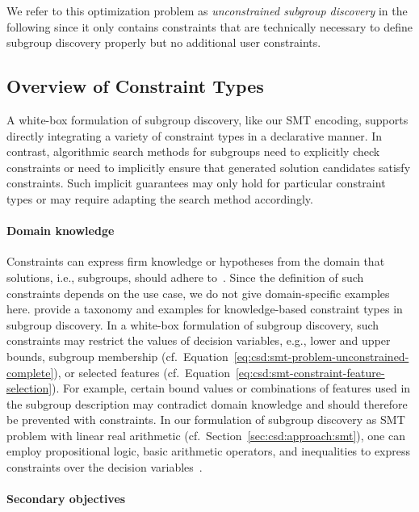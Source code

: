 \documentclass{article}
\theoremstyle{definition}
\begin{document}
We refer to this optimization problem as \emph{unconstrained subgroup discovery} in the following since it only contains constraints that are technically necessary to define subgroup discovery properly but no additional user constraints.

\subsection{Overview of Constraint Types}
\label{sec:csd:approach:constraint-types}

A white-box formulation of subgroup discovery, like our SMT encoding, supports directly integrating a variety of constraint types in a declarative manner.
In contrast, algorithmic search methods for subgroups need to explicitly check constraints or need to implicitly ensure that generated solution candidates satisfy constraints.
Such implicit guarantees may only hold for particular constraint types or may require adapting the search method accordingly.

\paragraph{Domain knowledge}

Constraints can express firm knowledge or hypotheses from the domain that solutions, i.e., subgroups, should adhere to~\cite{bach2022empirical}.
Since the definition of such constraints depends on the use case, we do not give domain-specific examples here.
\cite{atzmueller2006methodological, atzmueller2005exploiting, atzmueller2007using} provide a taxonomy and examples for knowledge-based constraint types in subgroup discovery.
In a white-box formulation of subgroup discovery, such constraints may restrict the values of decision variables, e.g., lower and upper bounds, subgroup membership (cf.~Equation~\ref{eq:csd:smt-problem-unconstrained-complete}), or selected features (cf.~Equation~\ref{eq:csd:smt-constraint-feature-selection}).
For example, certain bound values or combinations of features used in the subgroup description may contradict domain knowledge and should therefore be prevented with constraints.
In our formulation of subgroup discovery as SMT problem with linear real arithmetic (cf.~Section~\ref{sec:csd:approach:smt}), one can employ propositional logic, basic arithmetic operators, and inequalities to express constraints over the decision variables~\cite{barrett2018satisfiability}.

\paragraph{Secondary objectives}
\end{document}

